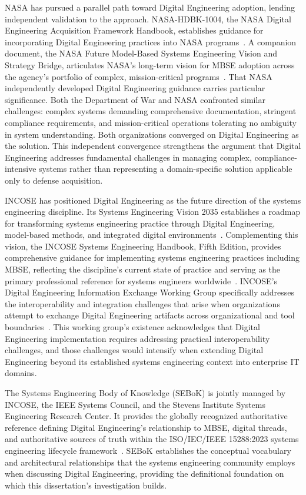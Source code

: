 NASA has pursued a parallel path toward Digital Engineering adoption, lending independent validation to the approach. NASA-HDBK-1004, the NASA Digital Engineering Acquisition Framework Handbook, establishes guidance for incorporating Digital Engineering practices into NASA programs~\parencite{NASA_HDBK_1004_2020}. A companion document, the NASA Future Model-Based Systems Engineering Vision and Strategy Bridge, articulates NASA's long-term vision for MBSE adoption across the agency's portfolio of complex, mission-critical programs~\parencite{NASA_MBSE_Vision_2021}. That NASA independently developed Digital Engineering guidance carries particular significance. Both the Department of War and NASA confronted similar challenges: complex systems demanding comprehensive documentation, stringent compliance requirements, and mission-critical operations tolerating no ambiguity in system understanding. Both organizations converged on Digital Engineering as the solution. This independent convergence strengthens the argument that Digital Engineering addresses fundamental challenges in managing complex, compliance-intensive systems rather than representing a domain-specific solution applicable only to defense acquisition.

INCOSE has positioned Digital Engineering as the future direction of the systems engineering discipline. Its Systems Engineering Vision 2035 establishes a roadmap for transforming systems engineering practice through Digital Engineering, model-based methods, and integrated digital environments~\parencite{INCOSE_Vision_2035}. Complementing this vision, the INCOSE Systems Engineering Handbook, Fifth Edition, provides comprehensive guidance for implementing systems engineering practices including MBSE, reflecting the discipline's current state of practice and serving as the primary professional reference for systems engineers worldwide~\parencite{INCOSE_Handbook_2023}. INCOSE's Digital Engineering Information Exchange Working Group specifically addresses the interoperability and integration challenges that arise when organizations attempt to exchange Digital Engineering artifacts across organizational and tool boundaries~\parencite{DigitalEngineeringInformationExchange}. This working group's existence acknowledges that Digital Engineering implementation requires addressing practical interoperability challenges, and those challenges would intensify when extending Digital Engineering beyond its established systems engineering context into enterprise IT domains.

The Systems Engineering Body of Knowledge (SEBoK) is jointly managed by INCOSE, the IEEE Systems Council, and the Stevens Institute Systems Engineering Research Center. It provides the globally recognized authoritative reference defining Digital Engineering's relationship to MBSE, digital threads, and authoritative sources of truth within the ISO/IEC/IEEE 15288:2023 systems engineering lifecycle framework~\parencite{SEBoK_2024}. SEBoK establishes the conceptual vocabulary and architectural relationships that the systems engineering community employs when discussing Digital Engineering, providing the definitional foundation on which this dissertation's investigation builds.

